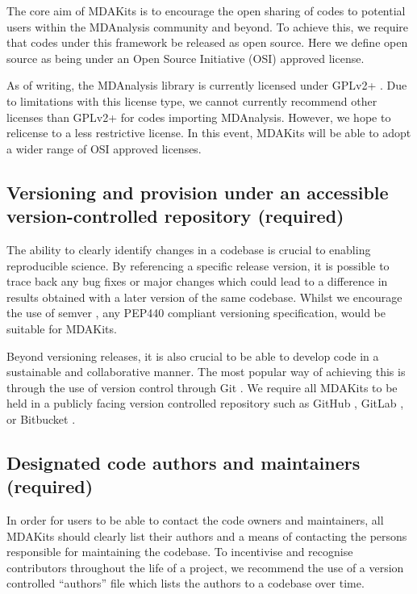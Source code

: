 \documentclass[9pt,whitepaper]{livecoms}
\begin{document}
The core aim of MDAKits is to encourage the open sharing of codes to potential users within the MDAnalysis community and beyond. To achieve this, we require that codes under this framework be released as open source. Here we define open source as being under an Open Source Initiative (OSI) approved license.

As of writing, the MDAnalysis library is currently licensed under GPLv2+ \cite{noauthor_gnu_nodate}. Due to limitations with this license type, we cannot currently recommend other licenses than GPLv2+ for codes importing MDAnalysis. However, we hope to relicense to a less restrictive license. In this event, MDAKits will be able to adopt a wider range of OSI approved licenses.
 
\subsection{Versioning and provision under an accessible version-controlled repository (required)}
\label{sec:versioning}

The ability to clearly identify changes in a codebase is crucial to enabling reproducible science. By referencing a specific release version, it is possible to trace back any bug fixes or major changes which could lead to a difference in results obtained with a later version of the same codebase. Whilst we encourage the use of semver \cite{preston-werner_semantic_nodate}, any PEP440 \cite{noauthor_pep_nodate-1} compliant versioning specification, would be suitable for MDAKits.

Beyond versioning releases, it is also crucial to be able to develop code in a sustainable and collaborative manner. The most popular way of achieving this is through the use of version control through Git \cite{noauthor_git_nodate}. We require all MDAKits to be held in a publicly facing version controlled repository such as GitHub \cite{github_inc_github_2022}, GitLab \cite{gitlab_inc_gitlab_2022}, or Bitbucket \cite{atlassian_bitbucket_2022}.

\subsection{Designated code authors and maintainers (required)}
\label{sec:authors}

In order for users to be able to contact the code owners and maintainers, all MDAKits should clearly list their authors and a means of contacting the persons responsible for maintaining the codebase. To incentivise and recognise contributors throughout the life of a project, we recommend the use of a version controlled “authors” file which lists the authors to a codebase over time.
 
\end{document}
